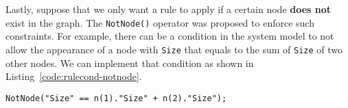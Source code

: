 \documentclass[a4paper,10pt,runningheads]{llncs}
\newcommand{\NotNode}[1]{{\tt NotNode(}#1{\tt )}}
\begin{document}
Lastly, suppose that we only want a rule to apply if a certain node \textbf{does not} exist in the graph.
The \NotNode{} operator was proposed to enforce such constraints.
For example, there can be a condition in the system model to not allow the appearance of a node with {\tt Size}
that equals to the sum of {\tt Size} of two other nodes.
We can implement that condition as shown in Listing~\ref{code:rulecond-notnode}.
\begin{lstlisting}[caption={Rule application condition example, NotNode}, label={code:rulecond-notnode}, style=rulecondstyle]
NotNode("Size" == n(1)."Size" + n(2)."Size");
\end{lstlisting}



\end{document}
